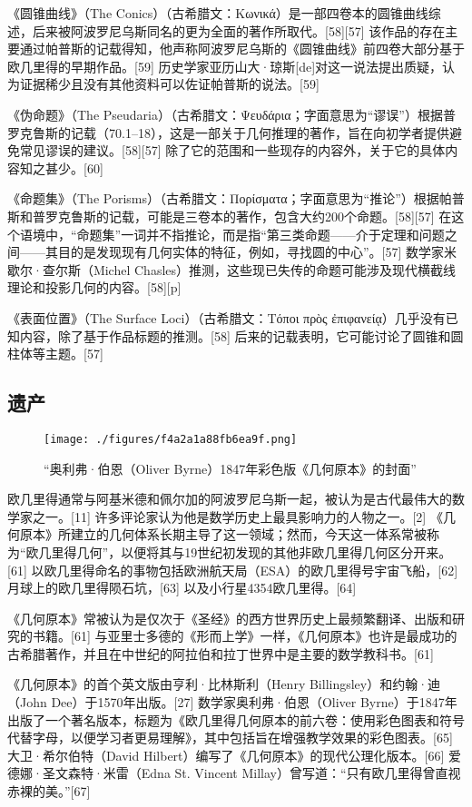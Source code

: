《圆锥曲线》（The Conics）（古希腊文：Κωνικά）是一部四卷本的圆锥曲线综述，后来被阿波罗尼乌斯同名的更为全面的著作所取代。[58][57] 该作品的存在主要通过帕普斯的记载得知，他声称阿波罗尼乌斯的《圆锥曲线》前四卷大部分基于欧几里得的早期作品。[59] 历史学家亚历山大·琼斯[de]对这一说法提出质疑，认为证据稀少且没有其他资料可以佐证帕普斯的说法。[59]

《伪命题》（The Pseudaria）（古希腊文：Ψευδάρια；字面意思为“谬误”）根据普罗克鲁斯的记载（70.1–18），这是一部关于几何推理的著作，旨在向初学者提供避免常见谬误的建议。[58][57] 除了它的范围和一些现存的内容外，关于它的具体内容知之甚少。[60]

《命题集》（The Porisms）（古希腊文：Πορίσματα；字面意思为“推论”）根据帕普斯和普罗克鲁斯的记载，可能是三卷本的著作，包含大约200个命题。[58][57] 在这个语境中，“命题集”一词并不指推论，而是指“第三类命题——介于定理和问题之间——其目的是发现现有几何实体的特征，例如，寻找圆的中心”。[57] 数学家米歇尔·查尔斯（Michel Chasles）推测，这些现已失传的命题可能涉及现代横截线理论和投影几何的内容。[58][p]

《表面位置》（The Surface Loci）（古希腊文：Τόποι πρὸς ἐπιφανείᾳ）几乎没有已知内容，除了基于作品标题的推测。[58] 后来的记载表明，它可能讨论了圆锥和圆柱体等主题。[57]
\subsection{遗产}
\begin{figure}[ht]
\centering
\texttt{[image: ./figures/f4a2a1a88fb6ea9f.png]}
\caption{“奥利弗·伯恩（Oliver Byrne）1847年彩色版《几何原本》的封面”} \label{fig_Euclid_7}
\end{figure}
欧几里得通常与阿基米德和佩尔加的阿波罗尼乌斯一起，被认为是古代最伟大的数学家之一。[11] 许多评论家认为他是数学历史上最具影响力的人物之一。[2] 《几何原本》所建立的几何体系长期主导了这一领域；然而，今天这一体系常被称为“欧几里得几何”，以便将其与19世纪初发现的其他非欧几里得几何区分开来。[61] 以欧几里得命名的事物包括欧洲航天局（ESA）的欧几里得号宇宙飞船，[62] 月球上的欧几里得陨石坑，[63] 以及小行星4354欧几里得。[64]

《几何原本》常被认为是仅次于《圣经》的西方世界历史上最频繁翻译、出版和研究的书籍。[61] 与亚里士多德的《形而上学》一样，《几何原本》也许是最成功的古希腊著作，并且在中世纪的阿拉伯和拉丁世界中是主要的数学教科书。[61]

《几何原本》的首个英文版由亨利·比林斯利（Henry Billingsley）和约翰·迪（John Dee）于1570年出版。[27] 数学家奥利弗·伯恩（Oliver Byrne）于1847年出版了一个著名版本，标题为《欧几里得几何原本的前六卷：使用彩色图表和符号代替字母，以便学习者更易理解》，其中包括旨在增强教学效果的彩色图表。[65] 大卫·希尔伯特（David Hilbert）编写了《几何原本》的现代公理化版本。[66] 爱德娜·圣文森特·米雷（Edna St. Vincent Millay）曾写道：“只有欧几里得曾直视赤裸的美。”[67]
